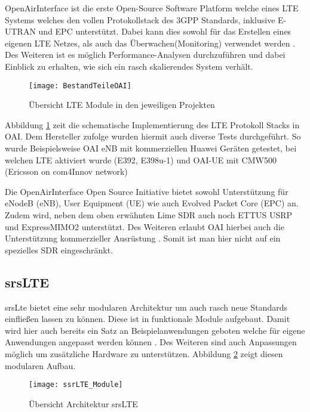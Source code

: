 OpenAirInterface ist die erste Open-Source Software Platform welche eines LTE Systems welches den vollen Protokollstack des 3GPP Standards, inklusive E-UTRAN und EPC unterstützt.
Dabei kann dies sowohl für das Erstellen eines eigenen LTE Netzes, als auch das Überwachen(Monitoring) verwendet werden \cite{nikaein2014openairinterface}.
Des Weiteren ist es möglich Performance-Analysen durchzuführen und dabei Einblick zu erhalten, wie sich ein rasch skalierendes System verhält. 

\begin{figure}[H]
	\centering
	\texttt{[image: BestandTeileOAI]}
	\caption{Übersicht LTE Module in den jeweiligen Projekten \protect\cite{openAirInterfaceOverview19}}
	\label{fig:modulesOAI}
\end{figure}


Abbildung \ref{fig:modulesOAI} zeit die schematische Implementierung des LTE Protokoll Stacks in OAI.
Dem Hersteller zufolge wurden hiermit auch diverse Tests durchgeführt. So wurde Beispielsweise OAI eNB mit kommerziellen Huawei Geräten getestet, bei welchen LTE aktiviert wurde (E392, E398u-1) und OAI-UE mit CMW500 (Ericsson on com4Innov network)

Die OpenAirInterface Open Source Initiative bietet sowohl Unterstützung für eNodeB (eNB), User Equipment (UE) wie auch Evolved Packet Core (EPC) an. Zudem wird, neben dem oben erwähnten Lime SDR auch noch ETTUS  USRP und ExpressMIMO2 unterstützt. Des Weiteren erlaubt OAI hierbei auch die Unterstützung kommerzieller Ausrüstung \cite{kaltenberger2019openairinterface}. Somit ist man hier nicht auf ein spezielles SDR eingeschränkt.

\subsection{srsLTE}
srsLte bietet eine sehr modularen Architektur um auch rasch neue Standards einfließen lassen zu können. Diese ist in funktionale Module aufgebaut. Damit wird hier auch bereits ein Satz an Beispielanwendungen geboten welche für eigene Anwendungen angepasst werden können \cite{puschmann2017implementing}. 
Des Weiteren sind auch Anpassungen möglich um zusätzliche Hardware zu unterstützen. 
Abbildung \ref{fig:modulessrsLTE} zeigt diesen modularen Aufbau.

\begin{figure}[H]
	\centering
	\texttt{[image: ssrLTE\_Module]}
	\caption{Übersicht Architektur srsLTE \protect\cite{puschmann2017implementing}}
	\label{fig:modulessrsLTE}
\end{figure}

